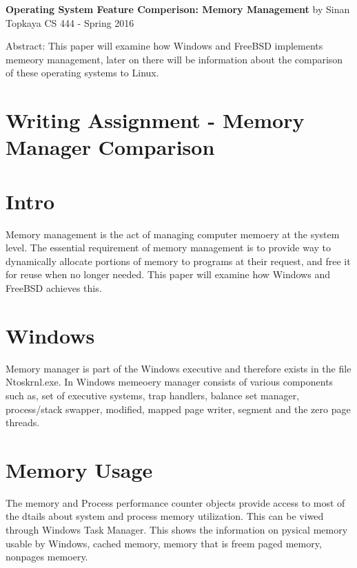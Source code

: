 \documentclass[letterpaper,10pt,draftclsnofoot,onecolumn]{IEEEtran}
\begin{document}
	\begin{titlepage}
		
		\begin{center}
		\bigbreak	
		\textbf{Operating System Feature Comperison: Memory Management}
		\bigbreak
		by Sinan Topkaya
		\smallbreak
		CS 444 - Spring 2016
		\end{center}
		\vfill
		
		Abstract: This paper will examine how Windows and FreeBSD implements memeory management, later on there will be information about the comparison of these operating systems to Linux. 
		
	\end{titlepage}

\section*{Writing Assignment - Memory Manager Comparison}
\section*{Intro}

Memory management is the act of managing computer memoery at the system level. The essential requirement of memory management is to provide way to dynamically allocate portions of memory to programs at their request, and free it for reuse when no longer needed. This paper will examine how Windows and FreeBSD achieves this. 

\section*{Windows}

Memory manager is part of the Windows executive and therefore exists in the file Ntoskrnl.exe. In Windows memeoery manager consists of various components such as, set of executive systems, trap handlers, balance set manager, process/stack swapper, modified, mapped page writer,
segment and the zero page threads.\cite{[1]}

\section*{Memory Usage}

The memory and Process performance counter objects provide access to most of the dtails about system and process memory utilization. This can be viwed through Windows Task Manager. This shows the information on pysical memory usable by Windows, cached memory, memory that is freem paged memory, nonpages memoery.
\end{document}
